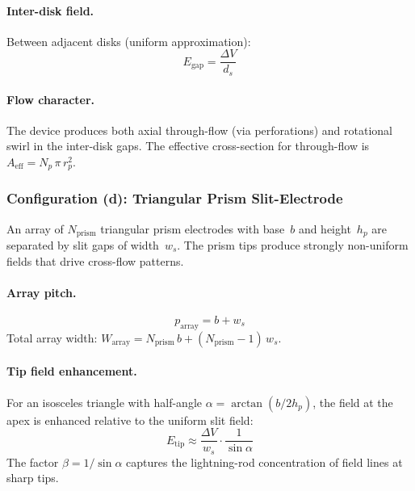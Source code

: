 \documentclass[11pt,a4paper]{article}
\begin{document}
\paragraph{Inter-disk field.}
Between adjacent disks (uniform approximation):
\begin{equation}\label{eq:disk_field}
  E_{\mathrm{gap}} = \frac{\Delta V}{d_s}
\end{equation}

\paragraph{Flow character.}
The device produces both axial through-flow (via perforations) and rotational
swirl in the inter-disk gaps.  The effective cross-section for through-flow is
$A_{\mathrm{eff}} = N_p\,\pi\,r_p^2$.

\subsubsection{Configuration (d): Triangular Prism Slit-Electrode}

An array of $N_{\mathrm{prism}}$ triangular prism electrodes with base~$b$
and height~$h_p$ are separated by slit gaps of width~$w_s$.  The prism tips
produce strongly non-uniform fields that drive cross-flow patterns.

\paragraph{Array pitch.}
\begin{equation}\label{eq:prism_pitch}
  p_{\mathrm{array}} = b + w_s
\end{equation}
Total array width:
$W_{\mathrm{array}} = N_{\mathrm{prism}}\,b + (N_{\mathrm{prism}} - 1)\,w_s$.

\paragraph{Tip field enhancement.}
For an isosceles triangle with half-angle
$\alpha = \arctan(b/2h_p)$, the field at the apex is enhanced relative to
the uniform slit field:
\begin{equation}\label{eq:prism_tip}
  E_{\mathrm{tip}} \approx \frac{\Delta V}{w_s} \cdot \frac{1}{\sin\alpha}
\end{equation}
The factor $\beta = 1/\sin\alpha$ captures the lightning-rod concentration
of field lines at sharp tips.

\end{document}
